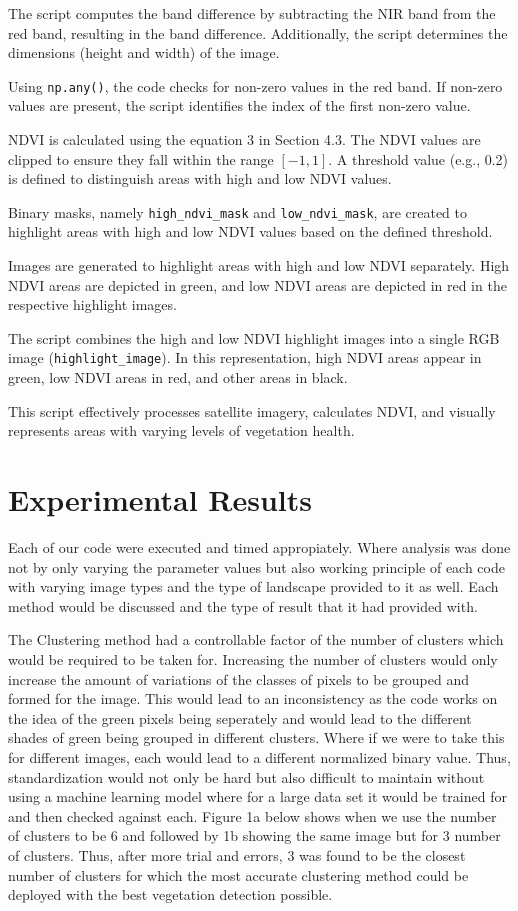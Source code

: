 \documentclass[12pt,a4paper,IEEEtran]{article}
\begin{document}
The script computes the band difference by subtracting the NIR band from the red band, resulting in the band difference. Additionally, the script determines the dimensions (height and width) of the image.

Using \texttt{np.any()}, the code checks for non-zero values in the red band. If non-zero values are present, the script identifies the index of the first non-zero value.

NDVI is calculated using the equation 3 in Section 4.3.
The NDVI values are clipped to ensure they fall within the range \([-1, 1]\). A threshold value (e.g., 0.2) is defined to distinguish areas with high and low NDVI values.

Binary masks, namely \texttt{high\_ndvi\_mask} and \texttt{low\_ndvi\_mask}, are created to highlight areas with high and low NDVI values based on the defined threshold.

Images are generated to highlight areas with high and low NDVI separately. High NDVI areas are depicted in green, and low NDVI areas are depicted in red in the respective highlight images.

The script combines the high and low NDVI highlight images into a single RGB image (\texttt{highlight\_image}). In this representation, high NDVI areas appear in green, low NDVI areas in red, and other areas in black.

This script effectively processes satellite imagery, calculates NDVI, and visually represents areas with varying levels of vegetation health.


\section{Experimental Results}
Each of our code were executed and timed appropiately. Where analysis was done not by only varying the parameter values but also working principle of each code with varying image types and the type of landscape provided to it as well. Each method would be discussed and the type of result that it had provided with. 

The Clustering method had a controllable factor of the number of clusters which would be required to be taken for.  Increasing the number of clusters would only increase the amount of variations of the classes of pixels to be grouped and formed for the image. This would lead to an inconsistency as the code works on the idea of the green pixels being seperately and would lead to the different shades of green being grouped in different clusters. Where if we were to take this for different images, each would lead to a different normalized binary value. Thus, standardization would not only be hard but also difficult to maintain without using a machine learning model where for a large data set it would be trained for and then checked against each. Figure 1a below shows when we use the number of clusters to be 6 and followed by 1b showing the same image but for 3 number of clusters. Thus, after more trial and errors, 3 was found to be the closest number of clusters for which the most accurate clustering method could be deployed with the best vegetation detection possible.  
\end{document}
